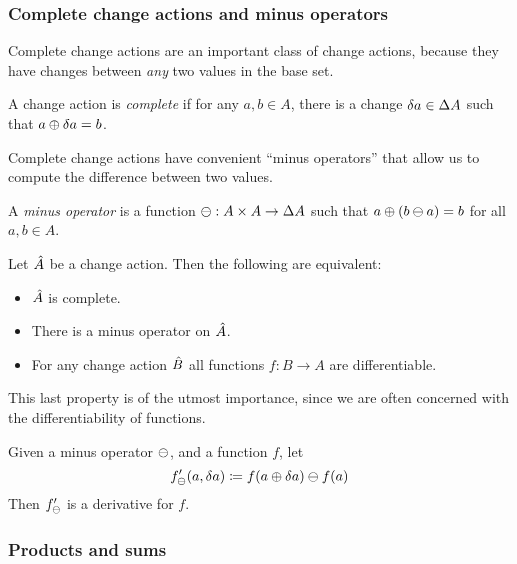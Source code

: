 \subsubsection{Complete change actions and minus operators}

Complete change actions are an important class of change actions, because they
have changes between \emph{any} two values in the base set.

\begin{defn}
  A change action is \emph{complete} if for any $a, b \in A$, there is
  a change $\delta a \in \Delta A$ such that $a \oplus \delta a = b$.
\end{defn}

Complete change actions have convenient ``minus operators'' that allow us to
compute the difference between two values.

\begin{defn}
  A \emph{minus operator} is a function $\ominus: A \times A \rightarrow
  \Delta A$ such that $a \oplus (b \ominus a) = b$ for all $a, b \in A$.
\end{defn}

\begin{prop}
  Let $\hat{A}$ be a change action. Then the following are equivalent:
  \begin{itemize}
    \item $\hat{A}$ is complete.
    \item There is a minus operator on $\hat{A}$.
    \item For any change action $\hat{B}$ all functions $f: {B} \rightarrow {A}$ are differentiable.
  \end{itemize}
\end{prop}

This last property is of the utmost importance, since we are often concerned with the differentiability
of functions.

\begin{prop}
  \label{prop:minusDerivatives}
  Given a minus operator $\ominus$, and a function $f$, let
  \begin{displaymath}
    f'_\ominus(a, \delta a) \coloneqq f(a \oplus \delta a) \ominus f(a)
  \end{displaymath}
  Then $f'_\ominus$ is a derivative for $f$.
\end{prop}

\subsubsection{Products and sums}
\label{sec:prodsum}

